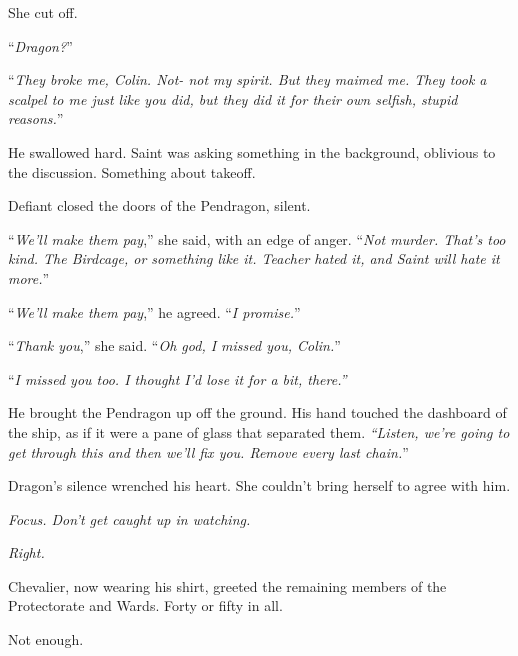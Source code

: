 She cut off.



``\emph{Dragon?}''



``\emph{They broke me, Colin.  Not- not my spirit.  But they maimed me.  They took a scalpel to me just like you did, but they did it for their own selfish, stupid reasons.}''



He swallowed hard.  Saint was asking something in the background, oblivious to the discussion.  Something about takeoff.



Defiant closed the doors of the Pendragon, silent.



``\emph{We'll make them pay},'' she said, with an edge of anger.  ``\emph{Not murder.  That's too kind.  The Birdcage, or something like it.  Teacher hated it, and Saint will hate it more.}''



``\emph{We'll make them pay},'' he agreed.  ``\emph{I promise.}''



``\emph{Thank you},'' she said.  ``\emph{Oh god, I missed you, Colin.}''



``\emph{I missed you too.  I thought I'd lose it for a bit, there.''}



He brought the Pendragon up off the ground.  His hand touched the dashboard of the ship, as if it were a pane of glass that separated them.\emph{  ``Listen, we're going to get through this and then we'll fix you.  Remove every last chain.}''



Dragon's silence wrenched his heart.  She couldn't bring herself to agree with him.



\emph{Focus.  Don't get caught up in watching.}



\emph{Right.}



\sectionbreak



Chevalier, now wearing his shirt, greeted the remaining members of the Protectorate and Wards.  Forty or fifty in all.



Not enough.



